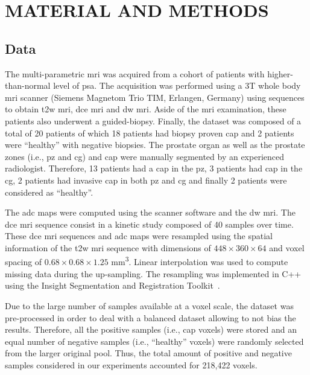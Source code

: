 \section{MATERIAL AND METHODS}\label{sec:methodology}

\subsection{Data}\label{subsec:data}

The multi-parametric \ac{mri} was acquired from a cohort of patients with higher-than-normal level of \ac{psa}. The acquisition was performed using a 3T whole body \ac{mri} scanner (Siemens Magnetom Trio TIM, Erlangen, Germany) using sequences to obtain \ac{t2w} \ac{mri}, \ac{dce} \ac{mri} and \ac{dw} \ac{mri}. Aside of the \ac{mri} examination, these patients also underwent a guided-biopsy. Finally, the dataset was composed of a total of 20 patients of which 18 patients had biopsy proven \ac{cap} and 2 patients were ``healthy'' with negative biopsies. The prostate organ as well as the prostate zones (i.e., \ac{pz} and \ac{cg}) and \ac{cap} were manually segmented by an experienced radiologist. Therefore, 13 patients had a \ac{cap} in the \ac{pz}, 3 patients had \ac{cap} in the \ac{cg}, 2 patients had invasive \ac{cap} in both \ac{pz} and \ac{cg} and finally 2 patients were considered as ``healthy''. 

The \ac{adc} maps were computed using the scanner software and the \ac{dw} \ac{mri}. The \ac{dce} \ac{mri} sequence consist in a kinetic study composed of 40 samples over time. These \ac{dce} \ac{mri} sequences and \ac{adc} maps were resampled using the spatial information of the \ac{t2w} \ac{mri} sequence with dimensions of $448 \times 360 \times 64$ and voxel spacing of $0.68 \times 0.68 \times 1.25 $ mm\textsuperscript{3}. Linear interpolation was used to compute missing data during the up-sampling. The resampling was implemented in C++ using the Insight Segmentation and Registration Toolkit~\cite{johnson2013}.

Due to the large number of samples available at a voxel scale, the dataset was pre-processed in order to deal with a balanced dataset allowing to not bias the results. Therefore, all the positive samples (i.e., \ac{cap} voxels) were stored and an equal number of negative samples (i.e., ``healthy'' voxels) were randomly selected from the larger original pool. Thus, the total amount of positive and negative samples considered in our experiments accounted for 218,422 voxels.

